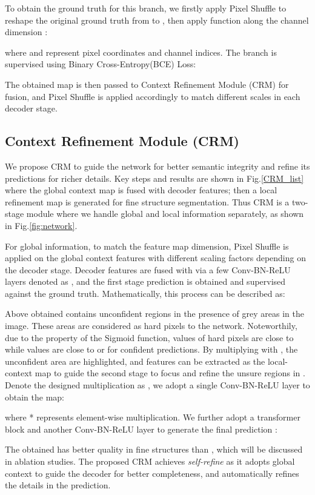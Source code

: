 \documentclass[letterpaper]{article} \usepackage{aaai22}  \usepackage{times}  \usepackage{helvet}  \usepackage{courier}  \usepackage[hyphens]{url}  \usepackage{graphicx} \urlstyle{rm} \def\UrlFont{\rm}  \usepackage{natbib}  \usepackage{caption} \DeclareCaptionStyle{ruled}{labelfont=normalfont,labelsep=colon,strut=off} \frenchspacing  \setlength{\pdfpagewidth}{8.5in}  \setlength{\pdfpageheight}{11in}  \usepackage{algorithm}
\begin{document}
To obtain the ground truth  for this branch, we firstly apply Pixel Shuffle to reshape the original ground truth  from  to , then apply  function along the channel dimension :

where  and  represent pixel coordinates and channel indices. The branch is supervised using Binary Cross-Entropy(BCE) Loss:

The obtained map is then passed to Context Refinement Module (CRM) for fusion, and Pixel Shuffle is applied accordingly to match different scales in each decoder stage.

\subsection{Context Refinement Module (CRM)}


We propose CRM to guide the network for better semantic integrity and refine its predictions for richer details. Key steps and results are shown in Fig.\ref{CRM_list} where the global context map is fused with decoder features; then a local refinement map is generated for fine structure segmentation. Thus CRM is a two-stage module where we handle global and local information separately, as shown in Fig.\ref{fig:network}.

For global information, to match the feature map dimension, Pixel Shuffle  is applied on the global context features  with different scaling factors  depending on the decoder stage. Decoder features  are fused with  via a few Conv-BN-ReLU layers denoted as , and the first stage prediction  is obtained and supervised against the ground truth. Mathematically, this process can be described as:


Above obtained  contains unconfident regions in the presence of grey areas in the image. These areas are considered as hard pixels to the network. Noteworthily, due to the property of the Sigmoid function, values of hard pixels are close to  while values are close to  or  for confident predictions. By multiplying  with , the unconfident area are highlighted, and features can be extracted as the local-context map  to guide the second stage to focus and refine the unsure regions in . Denote the designed multiplication as , we adopt a single Conv-BN-ReLU layer  to obtain the map:


where * represents element-wise multiplication. We further adopt a transformer block  and another Conv-BN-ReLU layer  to generate the final prediction :

The obtained  has better quality in fine structures than , which will be discussed in ablation studies. The proposed CRM achieves \textit{self-refine} as it adopts global context to guide the decoder for better completeness, and automatically refines the details in the prediction.
\end{document}
